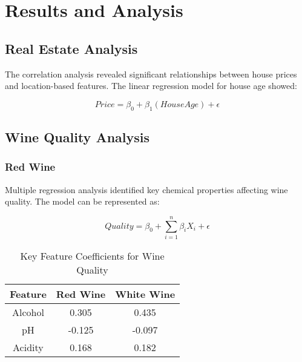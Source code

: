 \section{Results and Analysis}
\subsection{Real Estate Analysis}
The correlation analysis revealed significant relationships between house prices and location-based features. The linear regression model for house age showed:

\begin{equation}
    Price = \beta_0 + \beta_1(HouseAge) + \epsilon
\end{equation}

\subsection{Wine Quality Analysis}
\subsubsection{Red Wine}
Multiple regression analysis identified key chemical properties affecting wine quality. The model can be represented as:

\begin{equation}
    Quality = \beta_0 + \sum_{i=1}^{n} \beta_i X_i + \epsilon
\end{equation}

\begin{table}[!t]
\caption{Key Feature Coefficients for Wine Quality}
\begin{center}
\begin{tabular}{|c|c|c|}
\hline
\textbf{Feature} & \textbf{Red Wine} & \textbf{White Wine}\\
\hline
Alcohol & 0.305 & 0.435\\
pH & -0.125 & -0.097\\
Acidity & 0.168 & 0.182\\
\hline
\end{tabular}
\end{center}
\end{table} 